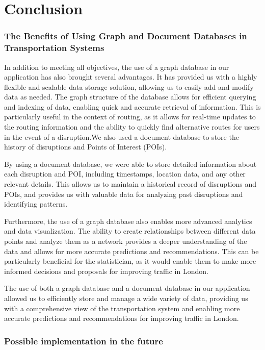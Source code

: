 \part{Conclusion}

\section{The Benefits of Using Graph and Document Databases in Transportation Systems}
In addition to meeting all objectives, the use of a graph database in our application has also brought several advantages. It has provided us with a highly flexible and scalable data storage solution, allowing us to easily add and modify data as needed. The graph structure of the database allows for efficient querying and indexing of data, enabling quick and accurate retrieval of information. This is particularly useful in the context of routing, as it allows for real-time updates to the routing information and the ability to quickly find alternative routes for users in the event of a disruption.We also used a document database to store the history of disruptions and Points of Interest (POIs).

By using a document database, we were able to store detailed information about each disruption and POI, including timestamps, location data, and any other relevant details. This allows us to maintain a historical record of disruptions and POIs, and provides us with valuable data for analyzing past disruptions and identifying patterns.

Furthermore, the use of a graph database also enables more advanced analytics and data visualization. The ability to create relationships between different data points and analyze them as a network provides a deeper understanding of the data and allows for more accurate predictions and recommendations. This can be particularly beneficial for the statistician, as it would enable them to make more informed decisions and proposals for improving traffic in London.

The use of both a graph database and a document database in our application allowed us to efficiently store and manage a wide variety of data, providing us with a comprehensive view of the transportation system and enabling more accurate predictions and recommendations for improving traffic in London.

\section{Possible implementation in the future}

